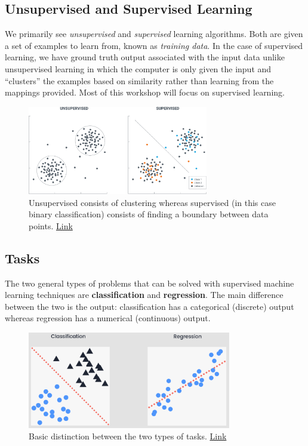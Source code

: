 \documentclass{article}
\begin{document}
\subsection{Unsupervised and Supervised Learning}
We primarily see \textit{unsupervised} and \textit{supervised} learning algorithms. Both are given a set of examples to learn from, known as \textit{training data}. In the case of supervised learning, we have ground truth output associated with the input data unlike unsupervised learning in which the computer is only given the input and ``clusters'' the examples based on similarity rather than learning from the mappings provided. Most of this workshop will focus on supervised learning. 
\begin{figure}[H]
    \centering
    \includegraphics[width=3.1in]{supervision.png}
    \caption{Unsupervised consists of clustering whereas supervised (in this case binary classification) consists of finding a boundary between data points. \href{https://chatbotsmagazine.com/lets-know-supervised-and-unsupervised-in-an-easy-way-9168363e06ab}{Link}}
\end{figure}

\newpage
\subsection{Tasks} 

The two general types of problems that can be solved with supervised machine learning techniques are \textbf{classification} and \textbf{regression}. The main difference between the two is the output: classification has a categorical (discrete) output whereas regression has a numerical (continuous) output. 

\begin{figure}[H]
    \centering
    \includegraphics[width=3.5in]{tasks.png}
    \caption{Basic distinction between the two types of tasks. \href{https://medium.com/datadriveninvestor/supervised-vs-unsupervised-machine-learning-5200ffa7301a}{Link}}
    \label{fig:tasks}
\end{figure}
\end{document}
